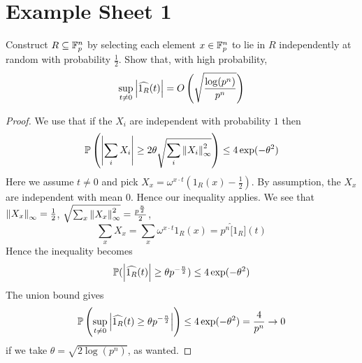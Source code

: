\documentclass{article}
\begin{document}
\maketitle

\tableofcontents

\clearpage
\section{Example Sheet 1}

\begin{problem}
  Construct $R \subseteq \mathbb F_p^n$ by selecting each element $x \in \mathbb F_p^n$ to lie in $R$ independently at random with probability $\frac 12$. Show that, with high probability,
  $$\sup_{t \ne 0} \left\lvert \widehat{1_R}(t)\right\rvert = O\left(\sqrt{\frac{\log(p^n)}{p^n}}\right)$$
\end{problem}
\begin{proof}
  We use that if the $X_i$ are independent with probability $1$ then
  $$\mathbb P\left(\left\lvert \sum_i X_i\right\rvert \ge 2\theta\sqrt{\sum_i \left\lVert X_i\right\rVert_\infty^2}\right) \le 4\exp(-\theta^2)$$
  Here we assume $t \ne 0$ and pick $X_x = \omega^{x \cdot t}(1_R(x) - \frac 12)$. By assumption, the $X_x$ are independent with mean $0$. Hence our inequality applies. We see that $\left\lVert X_x\right\rVert_\infty = \frac 12$, $\sqrt{\sum_x \left\lVert X_x\right\rVert_\infty^2} = \frac{p^{\frac n2}}2$,
  $$\sum_x X_x = \sum_x \omega^{x \cdot t} 1_R(x) = p^n \widehat[1_R](t)$$
  Hence the inequality becomes
  $$\mathbb P(\left\lvert \widehat{1_R}(t)\right\rvert \ge \theta p^{-\frac n2}) \le 4\exp(-\theta^2)$$
  The union bound gives
  $$\mathbb P\left(\sup_{t \ne 0}\left\lvert \widehat{1_R}(t) \ge \theta p^{-\frac n2}\right\rvert\right) \le 4\exp(-\theta^2) = \frac 4{p^n} \to 0$$
  if we take $\theta = \sqrt{2\log(p^n)}$, as wanted.
\end{proof}
\end{document}
